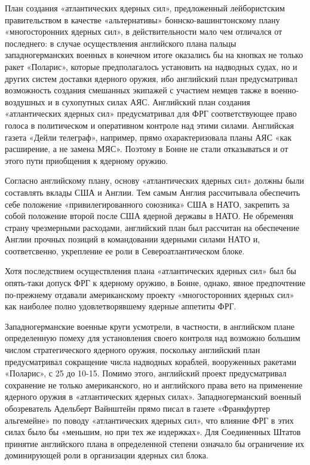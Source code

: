 \documentclass[12pt, a4paper, openany]{book}
\begin{document}
		План создания «атлантических ядерных сил», предложенный лейбористским правительством в качестве «альтернативы» боннско-вашингтонскому плану «многосторонних ядерных сил», в действительности мало чем отличался от последнего: в случае осуществления английского плана пальцы западногерманских военных в конечном итоге оказались бы на кнопках не только ракет «Поларис», которые предполагалось установить на надводных судах, но и других систем доставки ядерного оружия, ибо английский план предусматривал возможность создания смешанных экипажей с участием немцев также в военно-воздушных и в сухопутных силах АЯС. Английский план создания «атлантических ядерных сил» предусматривал для ФРГ соответствующее право голоса в политическом и оперативном контроле над этими силами. Английская газета «Дейли телеграф», например, прямо охарактеризовала планы АЯС «как расширение, а не замена МЯС». Поэтому в Бонне не стали отказываться и от этого пути приобщения к ядерному оружию.
		
		Согласно английскому плану, основу «атлантических ядерных сил» должны были составлять вклады США и Англии. Тем самым Англия рассчитывала обеспечить себе положение «привилегированного союзника» США в НАТО, закрепить за собой положение второй после США ядерной державы в НАТО. Не обременяя страну чрезмерными расходами, английский план был рассчитан на обеспечение Англии прочных позиций в командовании ядерными силами НАТО и, соответсвенно, укрепление ее роли в Североатлантическом блоке.
		
		Хотя последствием осуществления плана «атлантических ядерных сил» был бы опять-таки допуск ФРГ к ядерному оружию, в Бонне, однако, явное предпочтение по-прежнему отдавали американскому проекту «многосторонних ядерных сил» как наиболее полно удовлетворявшему ядерные аппетиты ФРГ.
		
		Западногерманские военные круги усмотрели, в частности, в английском плане определенную помеху для установления своего контроля над возможно большим числом стратегического ядерного оружия, поскольку английский план предусматривал сокращение числа надводных кораблей, вооруженных ракетами «Поларис», с 25 до 10-15. Помимо этого, английский проект предусматривал сохранение не только американского, но и английского права вето на применение ядерного оружия в «атлантических ядерных силах». Западногерманский военный обозреватель Адельберт Вайнштейн прямо писал в газете «Франкфуртер альгемейне» по поводу «атлантических ядерных сил», что влияние ФРГ в этих силах было бы «меньшим, но при тех же издержках». Для Соединенных Штатов принятие английского плана в определенной степени означало бы ограничение их доминирующей роли в организации ядерных сил блока.
		
\end{document}

